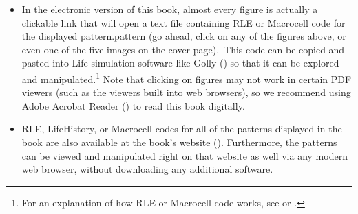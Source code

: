 \begin{itemize}
	\noindent\begin{minipage}{\linewidth}
		\centering
		\begin{minipage}[b]{0.56\textwidth}
			\centering
			\label{fig:preface_p15_gun}
		\end{minipage}\hfill
		\begin{minipage}[b]{0.4\textwidth}
			\centering
			\label{fig:preface_fx77_p5_eat}
		\end{minipage}\bigskip
	\end{minipage}
	
	\item In the electronic version of this book, almost every figure is actually a clickable link that will open a text file containing RLE or Macrocell code for the displayed \ifdefined\FORPRINTING pattern.\else pattern (go ahead, click on any of the figures above, or even one of the five images on the cover page).\fi\ This code can be copied and pasted into Life simulation software like Golly () so that it can be explored and manipulated.\footnote{For an explanation of how RLE or Macrocell code works, see  or .} Note that clicking on figures may not work in certain PDF viewers (such as the viewers built into web browsers), so we recommend using Adobe Acrobat Reader () to read this book digitally.\smallskip
	
	\item RLE, LifeHistory, or Macrocell codes for all of the patterns displayed in the book are also available at the book's website (). Furthermore, the patterns can be viewed and manipulated right on that website as well via any modern web browser, without downloading any additional software.\medskip
\end{itemize}


